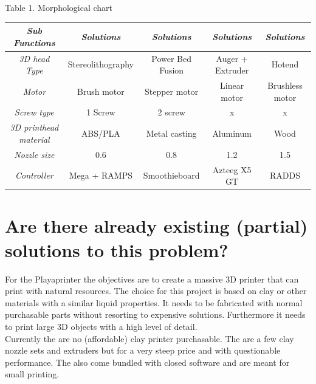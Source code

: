 \documentclass[11pt]{article}
\begin{document}
 	\begin{center}
Table 1. Morphological chart
\end{center}
 \begin{center}
 \begin{tabular}{|| c || c | c | c | c ||}
 
 \hline\hline
    \textit{Sub Functions} & \textit{Solutions} & \textit{Solutions}  & \textit{Solutions} & \textit{Solutions}   \\ [1.5ex]  
  \hline\hline
   
   \textit{3D head Type} & Stereolithography & Power Bed Fusion &  Auger + Extruder &  Hotend    \\
   \hline
    \textit{Motor} & Brush motor & Stepper motor & Linear motor & Brushless motor   \\
   \hline

 	\textit{Screw type} & 1 Screw &  2 screw & x & x  \\
   \hline   
   	\textit{3D printhead material}   & ABS/PLA & Metal casting & Aluminum & Wood     \\
   	\hline
   	\textit{Nozzle size}  & 0.6  & 0.8 &  1.2  & 1.5   \\
   	\hline 
   	\textit{Controller}  & Mega + RAMPS & Smoothieboard & Azteeg X5 GT  & RADDS   \\
   	\hline\hline 
   
   
 \end{tabular}
\end{center}  

\section{Are there already existing (partial) solutions to this problem? }
For the Playaprinter the  objectives are to create a massive 3D printer that can print with natural resources. The choice for this project is based on clay or other materials with a similar liquid properties. It needs to be fabricated with normal purchasable parts without resorting to expensive solutions. Furthermore it needs to print large 3D objects with a high level of detail.  \\

 Currently the are no (affordable) clay printer purchasable. The are a few clay nozzle sets and extruders but for a very steep price and with questionable performance. The also come bundled with closed software and are meant for small printing. \\ 
 
\end{document}
